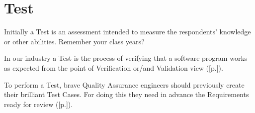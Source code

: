 \section{Test}
\label{sec:Test}

Initially a Test is an assessment intended to measure the respondents' knowledge or other abilities. Remember your class years?

In our industry a Test is the process of verifying that a software program works as expected from the point of Verification or/and Validation view ([p.\pageref{sec:Verification}]).

To perform a Test, brave Quality Assurance engineers should previously create their brilliant Test Cases. For doing this they need in advance the Requirements ready for review ([p.\pageref{sec:Requirement}]).